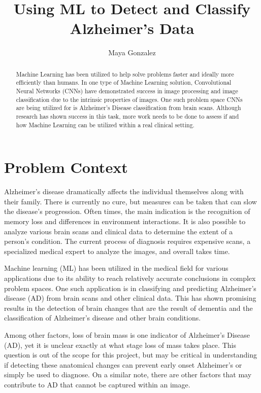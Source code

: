 \documentclass[10pt,twocolumn]{article}
\title{Using ML to Detect and Classify Alzheimer's Data}
\author{Maya Gonzalez}
\affiliation{Occidental College}
\begin{document}
\maketitle

\begin{abstract}
Machine Learning has been utilized to help solve problems faster and ideally more efficiently than humans. In one type of Machine Learning solution, Convolutional Neural Networks (CNNs) have demonstrated success in image processing and image classification due to the intrinsic properties of images. One such problem space CNNs are being utilized for is Alzheimer's Disease classification from brain scans. Although research has shown success in this task, more work needs to be done to assess if and how Machine Learning can be utilized within a real clinical setting.
\end{abstract}

\section{Problem Context}
Alzheimer's disease dramatically affects the individual themselves along with their family. There is currently no cure, but measures can be taken that can slow the disease's progression. Often times, the main indication is the recognition of memory loss and differences in environment interactions. It is also possible to analyze various brain scans and clinical data to determine the extent of a person's condition. The current process of diagnosis requires expensive scans, a specialized medical expert to analyze the images, and overall takes time. 

Machine learning (ML) has been utilized in the medical field for various applications due to its ability to reach relatively accurate conclusions in complex problem spaces. One such application is in classifying and predicting Alzheimer’s disease (AD) from brain scans and other clinical data. This has shown promising results in the detection of brain changes that are the result of dementia and the classification of Alzheimer's disease and other brain conditions. 

Among other factors, loss of brain mass is one indicator of Alzheimer's Disease (AD), yet it is unclear exactly at what stage loss of mass takes place. This question is out of the scope for this project, but may be critical in understanding if detecting these anatomical changes can prevent early onset Alzheimer's or simply be used to diagnose. On a similar note, there are other factors that may contribute to AD that cannot be captured within an image.
\end{document}
